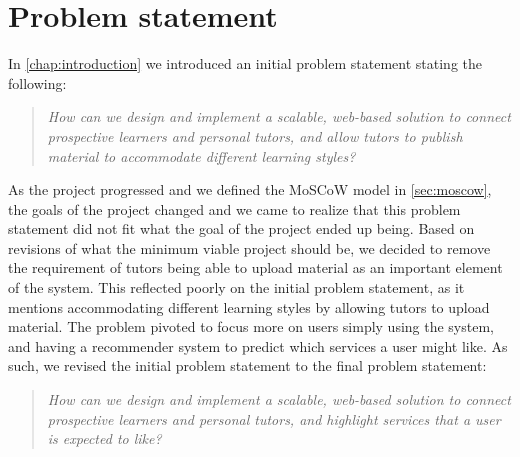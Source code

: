 \section{Problem statement}\label{sec:problemstatement}
In \autoref{chap:introduction} we introduced an initial problem statement stating the following:
\begin{quote}
    \textit{How can we design and implement a scalable, web-based solution to connect prospective learners and personal tutors, and allow tutors to publish material to accommodate different learning styles?}
\end{quote}
As the project progressed and we defined the MoSCoW model in \autoref{sec:moscow}, the goals of the project changed and we came to realize that this problem statement did not fit what the goal of the project ended up being.
Based on revisions of what the minimum viable project should be, we decided to remove the requirement of tutors being able to upload material as an important element of the system.
This reflected poorly on the initial problem statement, as it mentions accommodating different learning styles by allowing tutors to upload material.
The problem pivoted to focus more on users simply using the system, and having a recommender system to predict which services a user might like.
As such, we revised the initial problem statement to the final problem statement:
\begin{quote}
    \textit{How can we design and implement a scalable, web-based solution to connect prospective learners and personal tutors, and highlight services that a user is expected to like?}
\end{quote}
